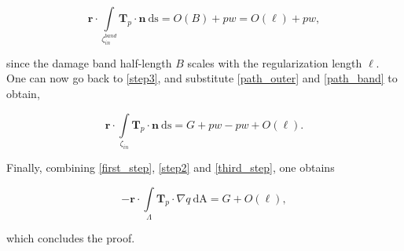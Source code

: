 \begin{equation}\label{path_band}
    \textbf{r}\cdot \int\limits_{\zeta^{band}_{in}}\textbf{T}_p\cdot\textbf{n}\ \text{ds} = O(B) + pw = O(\ell) + pw,
\end{equation}

\noindent since the damage band half-length $B$ scales with the regularization length $\ell$. One can now go back to \eqref{step3}, and substitute \eqref{path_outer} and \eqref{path_band} to obtain,

\begin{equation}\label{third_step}
    \textbf{r}\cdot\int\limits_{\zeta_{in}}\textbf{T}_p\cdot\textbf{n}\ \text{ds} = G + pw - pw + O(\ell).    
\end{equation}

\noindent Finally, combining \eqref{first_step}, \eqref{step2} and \eqref{third_step}, one obtains

\begin{equation}\label{end_step}
    -\textbf{r}\cdot\int\limits_{\Lambda}  \textbf{T}_p\cdot \nabla q\ \text{dA} =  G + O(\ell), 
\end{equation}

\noindent which concludes the proof.



